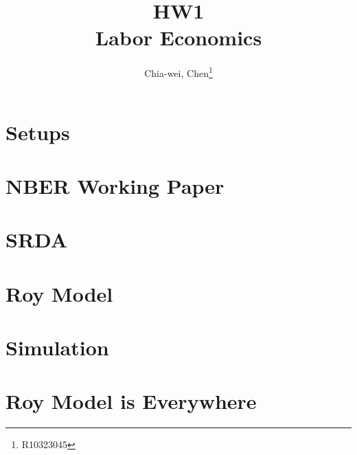 \documentclass[12pt]{article}
\author{Chia-wei, Chen\thanks{R10323045}}
\title{HW1 \\ Labor Economics}
\begin{document}
\begin{titlepage}
    \maketitle
\end{titlepage}

\section{Setups}






\section{NBER Working Paper}


\section{SRDA}


\section{Roy Model}


\section{Simulation}


\section{Roy Model is Everywhere}


\pagebreak


\end{document}
